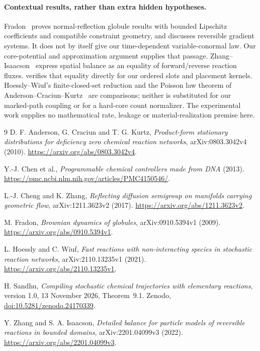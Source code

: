 \documentclass[11pt]{article}
\numberwithin{equation}{section}
\theoremstyle{definition}
\theoremstyle{remark}\newtheorem{remark}[theorem]{Remark}
\begin{document}
\paragraph{Contextual results, rather than extra hidden hypotheses.}
Fradon~\cite[Theorems~2.2, 2.4 and Proposition~3.4]{Fradon2009} proves
normal-reflection globule results with bounded Lipschitz coefficients and
compatible constraint geometry, and discusses reversible gradient systems.
It does not by itself give our time-dependent variable-conormal law.
Our core-potential and approximation argument supplies that passage.
Zhang--Isaacson~\cite[Section~III, equation (III.2), Theorem~III.1]{ZI2022}
express spatial balance as an equality of forward/reverse reaction fluxes.
 verifies that equality directly for our ordered slots
and placement kernels. Hoessly--Wiuf's finite-closed-set reduction
\cite[Assumption~2, Theorem~4.1]{HW2021} and the Poisson law theorem of
Anderson--Craciun--Kurtz~\cite[Theorem~4.1]{ACK2010} are comparisons;
neither is substituted for our marked-path coupling or for a hard-core count
normalizer. The experimental work \cite{Chen2013} supplies no mathematical
rate, leakage or material-realization premise here.


\clearpage
{}
{}

\begin{thebibliography}{9}
D. F. Anderson, G. Craciun and T. G. Kurtz,
\emph{Product-form stationary distributions for deficiency zero chemical
reaction networks}, arXiv:0803.3042v4 (2010).
\url{https://arxiv.org/abs/0803.3042v4}.

Y.-J. Chen et al., \emph{Programmable chemical controllers made from DNA}
(2013). \url{https://pmc.ncbi.nlm.nih.gov/articles/PMC4150546/}.

L.-J. Cheng and K. Zhang,
\emph{Reflecting diffusion semigroup on manifolds carrying geometric flow},
arXiv:1211.3623v2 (2017).
\url{https://arxiv.org/abs/1211.3623v2}.

M. Fradon, \emph{Brownian dynamics of globules}, arXiv:0910.5394v1 (2009).
\url{https://arxiv.org/abs/0910.5394v1}.

L. Hoessly and C. Wiuf, \emph{Fast reactions with non-interacting species in
stochastic reaction networks}, arXiv:2110.13235v1 (2021).
\url{https://arxiv.org/abs/2110.13235v1}.

H. Sandhu, \emph{Compiling stochastic chemical trajectories with elementary
reactions}, version 1.0, 13 November 2026, Theorem~9.1.
Zenodo, \href{https://doi.org/10.5281/zenodo.24170339}{doi:10.5281/zenodo.24170339}.

Y. Zhang and S. A. Isaacson, \emph{Detailed balance for particle models of
reversible reactions in bounded domains}, arXiv:2201.04099v3 (2022).
\url{https://arxiv.org/abs/2201.04099v3}.
\end{thebibliography}

\end{document}

